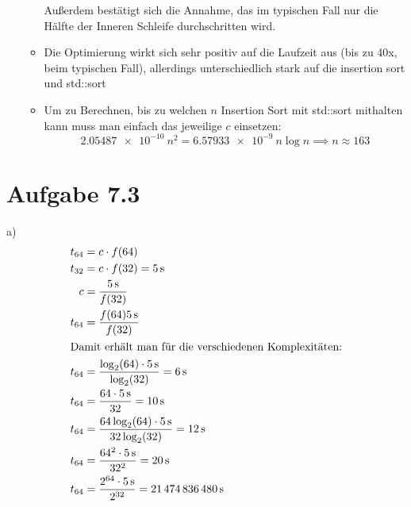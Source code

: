 \documentclass[a4paper]{scrartcl}
\begin{document}
\begin{itemize}
\begin{itemize}
Außerdem bestätigt sich die Annahme, das im typischen Fall nur die Hälfte der Inneren Schleife durchschritten
wird.
\item Die Optimierung wirkt sich sehr positiv auf die Laufzeit aus (bis zu 40x, beim typischen Fall), allerdings unterschiedlich stark auf die insertion sort und std::sort
\item Um zu Berechnen, bis zu welchen $n$ Insertion Sort mit std::sort mithalten kann muss man einfach das jeweilige $c$ einsetzen:
\[\SI{2.05487e-10}{}n^2 = \SI{6.57933e-9}{}n\log n \implies n \approx 163\]
\end{itemize}
\end{itemize}
\section*{Aufgabe 7.3}
a)
\begin{align*}
t_{64} &= c\cdot f(64) \\
t_{32} &= c\cdot f(32) = \SI{5}{\second} \\
c &= \frac{\SI{5}{\second}}{f(32)} \\
t_{64} &= \frac{f(64) \SI{5}{\second}}{f(32)} \\
\shortintertext{Damit erhält man für die verschiedenen Komplexitäten:}
t_{64} &= \frac{\log_2(64) \cdot\SI{5}{\second}}{\log_2(32)} = \SI{6}{\second} \\
t_{64} &= \frac{64 \cdot \SI{5}{\second}}{32} = \SI{10}{\second} \\
t_{64} &= \frac{64 \log_2(64) \cdot\SI{5}{\second}}{32 \log_2(32)} = \SI{12}{\second} \\
t_{64} &= \frac{64^2 \cdot\SI{5}{\second}}{32^2} = \SI{20}{\second} \\
t_{64} &= \frac{2^{64} \cdot\SI{5}{\second}}{2^{32}} = \SI{21474836480}{\second} \\
\end{align*}
\end{document}
